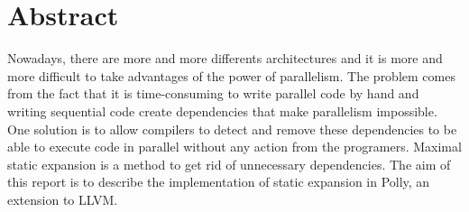 \begingroup
\let\clearpage\relax
\let\cleardoublepage\relax
\let\cleardoublepage\relax

\chapter*{Abstract}
Nowadays, there are more and more differents architectures and it is more and more difficult to take advantages of the power of parallelism. The problem comes from the fact that it is time-consuming to write parallel code by hand and writing sequential code create dependencies that make parallelism impossible. One solution is to allow compilers to detect and remove these dependencies to be able to execute code in parallel without any action from the programers. Maximal static expansion is a method to get rid of unnecessary dependencies. The aim of this report is to describe the implementation of static expansion in Polly, an extension to LLVM.

\vfill

\endgroup			

\vfill